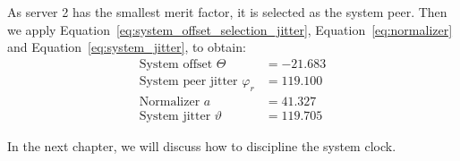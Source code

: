 As server 2 has the smallest merit factor, it is selected as the system peer.
Then we apply
Equation~\ref{eq:system_offset_selection_jitter}, Equation~\ref{eq:normalizer}
and Equation~\ref{eq:system_jitter}, to obtain:
\begin{align*}
    \text{System offset } \Theta & = -21.683\\ 
    \text{System peer jitter } \varphi_r &= 119.100\\
    \text{Normalizer } a &= 41.327\\
    \text{System jitter } \vartheta & = 119.705
\end{align*}

In the next chapter, we will discuss how to discipline the system clock.
